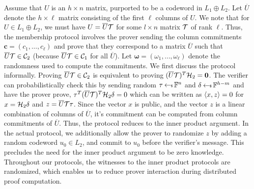 Assume that $U$ is an $h\times n$ matrix, purported to be a codeword in
$L_1\oplus L_2$. Let $\overline{U}$ denote the $h\times \ell$ matrix consisting of
the first $\ell$ columns of $U$. We note that for $U\in L_1\oplus L_2$, we must
have $U=\overline{U}\mathcal{T}$ for some $l\times n$ matrix $\mathcal{T}$ of rank $\ell$. Thus, the membership protocol involves the prover sending the column
commitments $\bm{c}=(c_1,\ldots,c_\ell)$ and prove that they correspond to a matrix
$\overline{U}$ such that $\overline{U}\mathcal{T}\in \mathcal{C}_2$ (because $\overline{U}\mathcal{T}\in
\mathcal{C}_1$ for all $\overline{U}$). Let $\bm{\omega}=(\omega_1,\ldots,\omega_\ell)$ denote 
the randomness used to compute the commitments. We first discuss the protocol
informally. Proving $\overline{U}\mathcal{T}\in \mathcal{C}_2$ is equivalent to proving
$(\overline{U}\mathcal{T})^T\mathcal{H}_2=\bm{0}$. The verifier can probabilistically
check this by sending random $\tau\hskip2.3pt{\gets\!\!\mbox{\tiny${\$}$\normalsize}}\, \mathbb{F}^n$ and $\delta\hskip2.3pt{\gets\!\!\mbox{\tiny${\$}$\normalsize}}\, \mathbb{F}^{h-m}$
and have the prover prove, $\tau^T(\overline{U}\mathcal{T})^T\mathcal{H}_2\delta=0$ which
can be written as $\langle x,z\rangle=0$ for $x=\mathcal{H}_2\delta$ and
$z=\overline{U}\mathcal{T}\tau$. Since the vector $x$ is public, and the vector $z$
is a linear combination of columns of $\overline{U}$, it's commitment can be
computed from column commitments of $\overline{U}$. Thus, the protocol reduces
to the inner product argument. In the actual protocol, we additionally allow the
prover to randomize $z$ by adding a random codeword $u_0\in L_2$, and commit to
$u_0$ before the verifier's message. This precludes the need for the inner
product argument to be zero knowledge. Throughout our protocols, the witnesses
to the inner product protocols are randomized, which enables us to reduce prover
interaction during distributed proof computation. 

